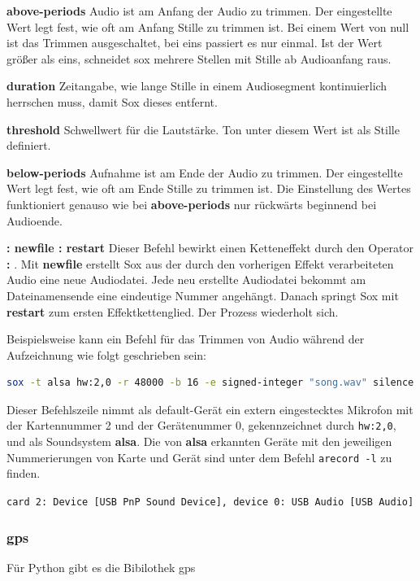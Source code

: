 \textbf{above-periods} Audio ist am Anfang der Audio zu trimmen. Der eingestellte Wert legt fest, wie oft am Anfang Stille zu trimmen ist. Bei einem Wert von null ist das Trimmen ausgeschaltet, bei eins passiert es nur einmal. Ist der Wert größer als eins, schneidet sox mehrere Stellen mit Stille ab Audioanfang raus.

\textbf{duration} Zeitangabe, wie lange Stille in einem Audiosegment kontinuierlich herrschen muss, damit Sox dieses entfernt.

\textbf{threshold} Schwellwert für die Lautstärke. Ton unter diesem Wert ist als Stille definiert.

\textbf{below-periods} Aufnahme ist am Ende der Audio zu trimmen. Der eingestellte Wert legt fest, wie oft am Ende Stille zu trimmen ist. Die Einstellung des Wertes funktioniert genauso wie bei \textbf{above-periods} nur rückwärts beginnend bei Audioende.

\textbf{: newfile : restart} Dieser Befehl bewirkt einen Ketteneffekt durch den Operator \textbf{:} .  Mit \textbf{newfile} erstellt Sox aus der durch den vorherigen Effekt verarbeiteten Audio eine neue Audiodatei. Jede neu erstellte Audiodatei bekommt am Dateinamensende eine eindeutige Nummer angehängt. Danach springt Sox mit \textbf{restart} zum ersten Effektkettenglied. Der Prozess wiederholt sich.

Beispielsweise kann ein Befehl für das Trimmen von Audio während der Aufzeichnung wie folgt geschrieben sein:
\begin{lstlisting}[language=bash,caption={Besipiel eines SOX-Aufrufs mit Trimmen von Stille während der Konvertierung},]
sox -t alsa hw:2,0 -r 48000 -b 16 -e signed-integer "song.wav" silence 1 0.50t 0.1% 1 2.0 0.1% : newfile : restart
\end{lstlisting}

Dieser Befehlszeile nimmt als default-Gerät ein extern eingestecktes Mikrofon mit der Kartennummer 2 und der Gerätenummer 0, gekennzeichnet durch \lstinline{hw:2,0}, und als Soundsystem \textbf{alsa}. 
Die von \textbf{alsa} erkannten Geräte mit den jeweiligen Nummerierungen von Karte und Gerät sind unter dem Befehl \lstinline{arecord -l} zu finden. 

\lstinline[caption=Beispiel für eine mögliche Ausgabe]{card 2: Device [USB PnP Sound Device], device 0: USB Audio [USB Audio]}


\subsubsection{gps}
\label{subsubsec:gps}
Für Python gibt es die Bibilothek gps


